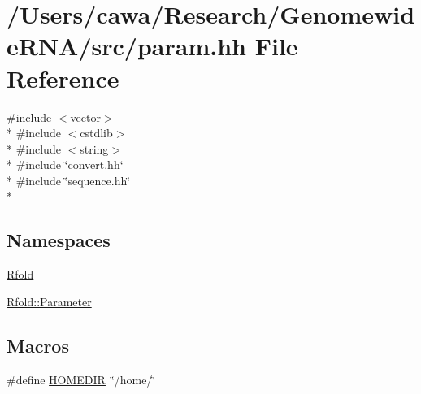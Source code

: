 \hypertarget{param_8hh}{\section{/\+Users/cawa/\+Research/\+Genomewide\+R\+N\+A/src/param.hh File Reference}
\label{param_8hh}
}
{\ttfamily \#include $<$vector$>$}\\*
{\ttfamily \#include $<$cstdlib$>$}\\*
{\ttfamily \#include $<$string$>$}\\*
{\ttfamily \#include \char`\"{}convert.\+hh\char`\"{}}\\*
{\ttfamily \#include \char`\"{}sequence.\+hh\char`\"{}}\\*
\subsection*{Namespaces}
\begin{DoxyCompactItemize}
\item 
 \hyperlink{namespace_rfold}{Rfold}
\item 
 \hyperlink{namespace_rfold_1_1_parameter}{Rfold\+::\+Parameter}
\end{DoxyCompactItemize}
\subsection*{Macros}
\begin{DoxyCompactItemize}
\item 
\#define \hyperlink{param_8hh_abd012aab0d5d08997f31c0eeedebb40d}{H\+O\+M\+E\+D\+I\+R}~\char`\"{}/home/\char`\"{}
\end{DoxyCompactItemize}

